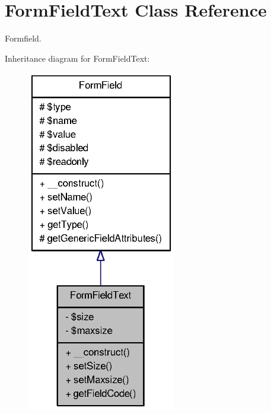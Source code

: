\section{FormFieldText Class Reference}
\label{classFormFieldText}


Formfield.  




Inheritance diagram for FormFieldText:\nopagebreak
\begin{figure}[H]
\begin{center}
\leavevmode
\includegraphics[width=184pt]{classFormFieldText__inherit__graph}
\end{center}
\end{figure}


